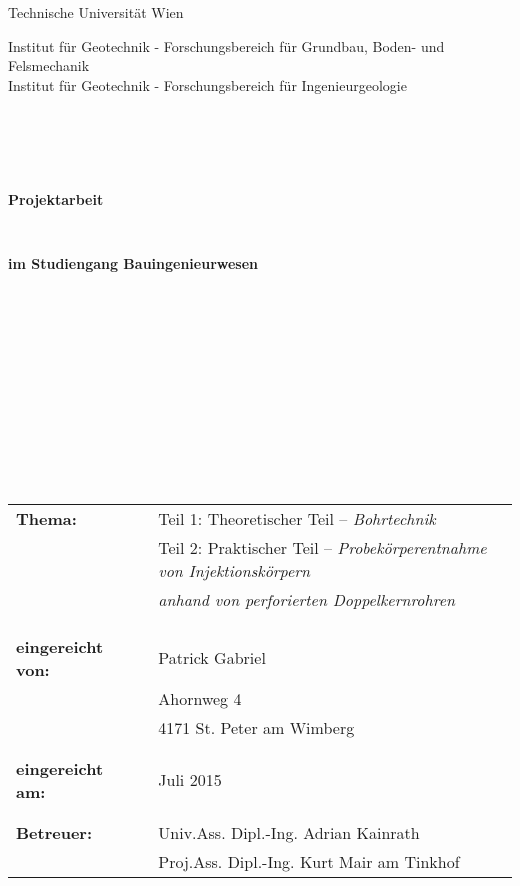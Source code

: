\documentclass[12pt,a4paper,draft]{scrartcl} %
\begin{document}
\thispagestyle{empty}
\begin{center}
\Large{Technische Universität Wien}\\
\end{center}


\begin{center}
\small{Institut für Geotechnik - Forschungsbereich für Grundbau, Boden- und Felsmechanik}\\
\small{Institut für Geotechnik - Forschungsbereich für Ingenieurgeologie}
\end{center}
\begin{verbatim}





\end{verbatim}
\begin{center}
\textbf{\LARGE{Projektarbeit}}
\end{center}
\begin{verbatim}


\end{verbatim}
\begin{center}
\textbf{im Studiengang Bauingenieurwesen}
\end{center}
\begin{verbatim}













\end{verbatim}

\begin{flushleft}
\begin{tabular}{lll}
\textbf{Thema:} 
& & Teil 1: Theoretischer Teil -- \emph{Bohrtechnik}\\
& & Teil 2: Praktischer Teil -- \emph{Probekörperentnahme von Injektionskörpern} \\
& & \emph{anhand von perforierten Doppelkernrohren}\\
& & \\
& & \\
& & \\
\textbf{eingereicht von:} & & Patrick Gabriel \\
& & Ahornweg 4\\
& & 4171 St. Peter am Wimberg\\
& & \\
& & \\
\textbf{eingereicht am:} & & Juli 2015\\
& & \\
& & \\
\textbf{Betreuer:} & & Univ.Ass. Dipl.-Ing. Adrian Kainrath\\
& &  Proj.Ass. Dipl.-Ing. Kurt Mair am Tinkhof
\end{tabular}
\end{flushleft}
\end{document}
